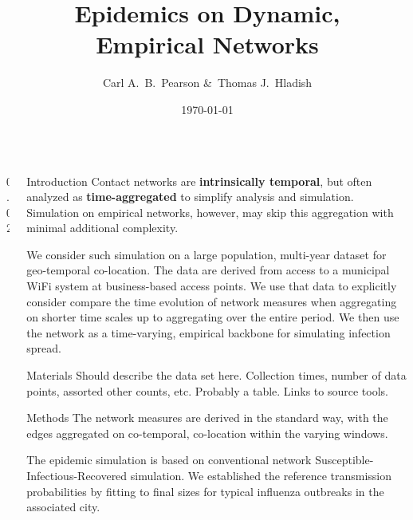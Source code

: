 \documentclass[final]{beamer} %
\title[Epi. on Emp. Nets]{Epidemics on Dynamic,\\ Empirical Networks}
\author[Pearson \& Hladish]{Carl A.~B.~Pearson \&\ Thomas J.~Hladish}
\institute[EPI-UF]{Emerging Pathogens Institute, University of Florida}
\date{\today}
\newcommand{\spaceProp}{0.02}
\newcommand{\spacer}{\begin{column}{\spaceProp\paperwidth}\end{column}}
\newenvironment{oneCol}{\begin{column}[t]{0.225\paperwidth}}{\end{column}}
\begin{document}

  \begin{frame}{}
    \begin{columns}[t]
    \spacer{}
    \begin{oneCol}
    \begin{block}{Introduction}
Contact networks are \textbf{intrinsically temporal}, but often analyzed as \textbf{time-aggregated} to simplify analysis and simulation.  Simulation on empirical networks, however, may skip this aggregation with minimal additional complexity.

We consider such simulation on a large population, multi-year dataset for geo-temporal co-location.  The data are derived from access to a municipal WiFi system at business-based access points.  We use that data to explicitly consider compare the time evolution of network measures when aggregating on shorter time scales up to aggregating over the entire period.  We then use the network as a time-varying, empirical backbone for simulating infection spread.
    \end{block}
    \begin{block}{Materials}
Should describe the data set here.  Collection times, number of data points, assorted other counts, etc.  Probably a table.  Links to source tools.
    \end{block}
    \begin{block}{Methods}
The network measures are derived in the standard way, with the edges aggregated on co-temporal, co-location within the varying windows. 

The epidemic simulation is based on conventional network Susceptible-Infectious-Recovered simulation.  We established the reference transmission probabilities by fitting to final sizes for typical influenza outbreaks in the associated city.


\end{block}
\end{oneCol}
\end{columns}
\end{frame}
\end{document}
